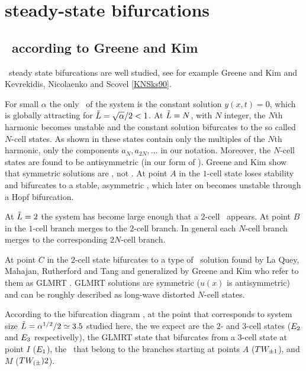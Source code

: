 %

\section{\KS steady-state bifurcations}
\label{sec:KSlit}

\subsection{\Eqva\ according to Greene and Kim}

\KSe\ steady state bifurcations are well studied, see for example Greene and Kim and
Kevrekidis, Nicolaenko and Scovel \ref{KNSks90}. 

For small $\alpha$ the only \eqv\ of the system is the constant solution $y(x,t)=0$,
which is globally attracting 
for $\tilde{L}=\sqrt{\alpha}/2<1$. At $\tilde{L}=N$, with $N$ integer, 
the $N$th harmonic becomes unstable and the constant solution
bifurcates to the so called $N$-cell states. 
As shown in  these states contain only the multiples of the $N$th
harmonic, {\ie} only the components $a_N,a_{2N},...$ in our notation.
Moreover, the $N$-cell states are found to be antisymmetric (in our form of \KSe).
Greene and Kim show that symmetric solutions are \eqva, not \reqva. 
At point $A$ in  the $1$-cell state loses stability
and bifurcates to a stable, 
asymmetric \reqv, which later on becomes unstable through a Hopf bifurcation. 

At $\tilde{L}=2$ the system has become large enough that a $2$-cell \eqv\ appears. At point $B$
in  the $1$-cell branch merges to the $2$-cell branch. In general each $N$-cell branch merges to the corresponding $2N$-cell branch.

At point $C$ in  the $2$-cell state bifurcates to a type of 
\eqv\ solution
found by La Quey, Mahajan, Rutherford and Tang and generalized by Greene and Kim who refer to them as GLMRT \eqva. GLMRT solutions are symmetric 
($u(x)$ is antisymmetric)
and can be roughly described as long-wave distorted $N$-cell states.


According to the bifurcation diagram , 
at the point that corresponds to system size $\tilde{L}=\alpha^{1/2}/2\simeq3.5$
studied here,
the {\eqva} we expect are the $2$- and $3$-cell states ($E_{2}$ and $E_{3}$ respectivelly), the GLMRT state that bifurcates from a $3$-cell state at point $I$ ($E_{1}$),
the \reqva\ that belong to the branches starting at points $A$ ($TW_{\pm1}$),
and $M$ ($TW_{(\pm}){2}$).


